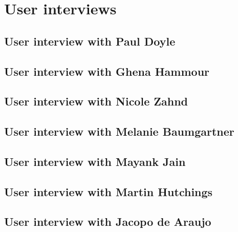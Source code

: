 \chapter{User interviews}

\section*{User interview with Paul Doyle}

\section*{User interview with Ghena Hammour}

\section*{User interview with Nicole Zahnd}

\section*{User interview with Melanie Baumgartner}

\section*{User interview with Mayank Jain}

\section*{User interview with Martin Hutchings}

\section*{User interview with Jacopo de Araujo}
